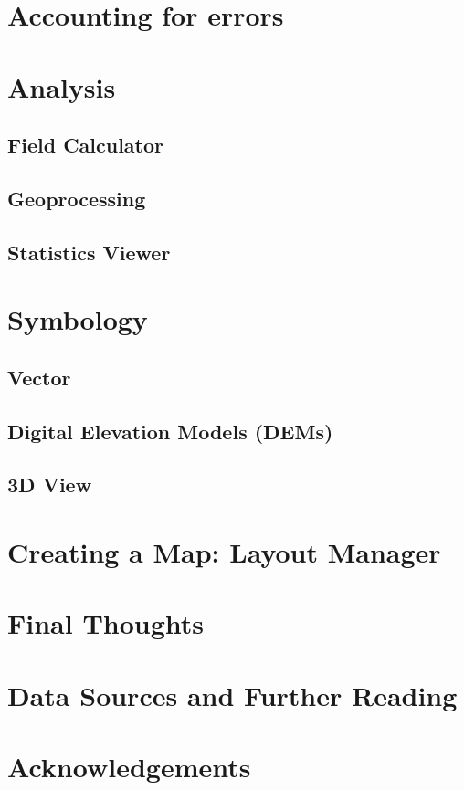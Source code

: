 \documentclass{article}
\begin{document}
\section{Accounting for errors}

\section{Analysis}

\subsection{Field Calculator}

\subsection{Geoprocessing}

\subsection{Statistics Viewer}

\section{Symbology}

\subsection{Vector}

\subsection{Digital Elevation Models (DEMs)}

\subsection{3D View}

\section{Creating a Map: Layout Manager}

\section{Final Thoughts}

\section{Data Sources and Further Reading}

\section{Acknowledgements}

\newpage
\printbibliography
\end{document}
